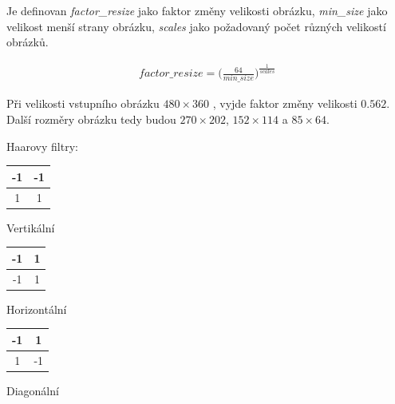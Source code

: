 \documentclass[czech,BP]{thesiskiv}
\begin{document}
\par Je definovan \textit{factor\_resize} jako faktor změny velikosti obrázku, \textit{min\_size} jako velikost menší strany obrázku, \textit{scales} jako požadovaný počet různých velikostí obrázků. 

\begin{align}
   \label{Haar_factor_resize} factor\_resize = \Bigg(\frac{64}{min\_size}\Bigg)^{\frac{1}{scales}}   
\end{align}

\par Při velikosti vstupního obrázku $480 \times 360$ , vyjde faktor změny velikosti $0.562$. Další rozměry obrázku tedy budou $270 \times 202$, $152 \times 114 $ a $85 \times 64$.



\vspace{0.5cm}
\noindent Haarovy filtry: 

\begin{multicols}{3}
	\begin{center}
		\begin{tabular}{ | c | c | }
    		\hline
    		\cellcolor{ashgrey!50}-1 & \cellcolor{ashgrey!50}-1 \\ \hline
    		1 & 1 \\ 
    		\hline
    	\end{tabular}
    	\vspace{0.5cm}
    	\par Vertikální
	\end{center}
	\begin{center}
		\begin{tabular}{ | c | c | }
    		\hline
    		\cellcolor{ashgrey!50}-1 & 1 \\ \hline
    		\cellcolor{ashgrey!50}-1 & 1 \\ 
    		\hline
    	\end{tabular}
		\vspace{0.5cm}
    	\par Horizontální
	\end{center} 	
	\begin{center}
		\begin{tabular}{ | c | c | }
    		\hline
    		\cellcolor{ashgrey!50}-1 & 1 \\ \hline
    		1 & \cellcolor{ashgrey!50}-1 \\ 
    		\hline
    	\end{tabular}
		\vspace{0.5cm}
    	\par Diagonální
	\end{center} 	
\end{multicols}
\end{document}
